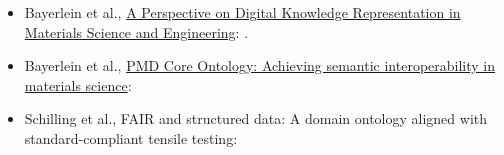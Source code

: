 \begin{itemize}
    \item Bayerlein et al., \href{https://doi.org/10.1002/adem.202101176}{A Perspective on Digital Knowledge Representation in Materials Science and Engineering}: \cite{BayerleinPerspective2022}.
    \item Bayerlein et al., \href{https://doi.org/10.1016/j.matdes.2023.112603}{PMD Core Ontology: Achieving semantic interoperability in materials science}: \cite{BayerleinPMDco2024}
    \item Schilling et al., FAIR and structured data: A domain ontology aligned with standard-compliant tensile testing: \cite{SchillingTTO2023}
\end{itemize}